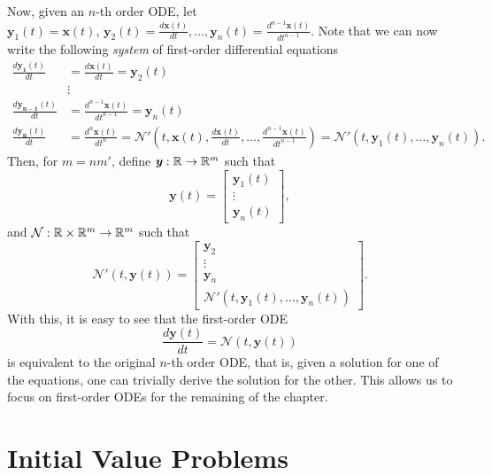 Now, given an $n$-th order \gls{ODE}, let $\bm{y}_1\left( t \right) =\bm{x}\left( t \right),\,\bm{y}_2\left( t \right) = \frac{d \bm{x}\left( t \right) }{d t} ,\ldots, \bm{y}_n\left( t \right) = \frac{d^{n-1} \bm{x}\left( t \right) }{d t^{n-1}}$.
Note that we can now write the following \emph{system} of first-order differential equations
\begin{align*}
    \frac{d \bm{y_1}\left( t \right) }{dt} &= \frac{d \bm{x}\left( t \right) }{d t} = \bm{y}_2\left( t \right) \\
    &\vdots \\
    \frac{d \bm{y_{n-1}}\left( t \right) }{dt} &= \frac{d^{n-1} \bm{x}\left( t \right) }{d t^{n-1}} = \bm{y}_n\left( t \right) \\
    \frac{d \bm{y_n}\left( t \right) }{dt} &= \frac{d^{n} \bm{x}\left( t \right) }{d t^{n}} = \mathcal{N}'\left( t, \bm{x}\left( t \right), \frac{d \bm{x}(t)}{d t}, \ldots,\frac{d^{n-1}\bm{x}(t)}{d t^{n-1}} \right) = \mathcal{N}'\left( t, \bm{y}_1\left( t \right), \ldots, \bm{y}_n\left( t \right) \right)
.\end{align*}
Then, for $m=n m'$, define $\textbf{\textit{y}}:\mathbb{R}\to \mathbb{R}^{m}$ such that \[
\bm{y}\left( t \right)  = \begin{bmatrix} 
\bm{y}_1\left( t \right) \\ \vdots \\ \bm{y}_n\left( t \right) 
\end{bmatrix} 
,\] and $\mathcal{N}:\mathbb{R}\times \mathbb{R}^{m}\to \mathbb{R}^{m}$ such that \[
    \mathcal{N}'\left( t,\bm{y}\left( t \right)  \right) = \begin{bmatrix} 
    \bm{y}_2 \\ \vdots \\ \bm{y}_n \\ \mathcal{N}'\left( t, \bm{y}_1\left( t \right), \ldots, \bm{y}_n\left( t \right) \right)
    \end{bmatrix} 
.\] With this, it is easy to see that the first-order \gls{ODE}
\begin{equation}\label{eq:ode}
\frac{d \bm{y}\left( t \right) }{d t} = \mathcal{N}\left( t, \bm{y}\left( t \right)  \right) 
\end{equation}
is equivalent to the original $n$-th order \gls{ODE}, that is, given a solution for one of the equations, one can trivially derive the solution for the other.
This allows us to focus on first-order \gls{ODE}s for the remaining of the chapter.

\section{Initial Value Problems}

